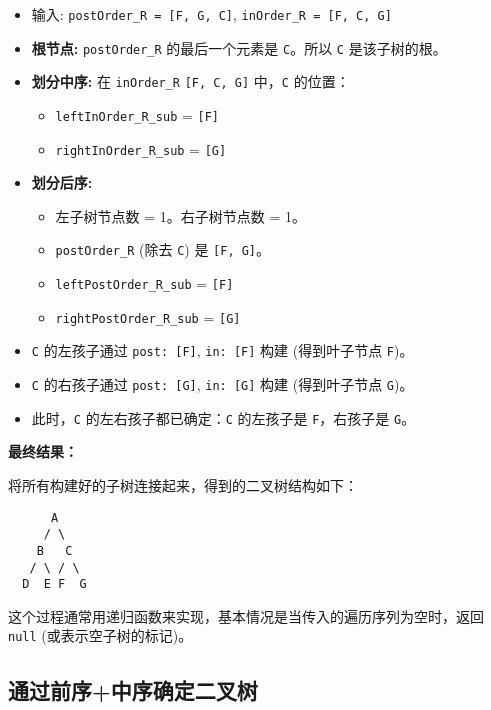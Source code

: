 \begin{enumerate}
	\begin{itemize}
		\item 输入: \lstinline{postOrder_R = [F, G, C]}, \lstinline{inOrder_R = [F, C, G]}
		\item \textbf{根节点:} \lstinline{postOrder_R} 的最后一个元素是 \lstinline{C}。所以 \lstinline{C} 是该子树的根。
		\item \textbf{划分中序:} 在 \lstinline{inOrder_R} \lstinline{[F, C, G]} 中，\lstinline{C} 的位置：
		\begin{itemize}
			\item \lstinline{leftInOrder_R_sub} = \lstinline{[F]}
			\item \lstinline{rightInOrder_R_sub} = \lstinline{[G]}
		\end{itemize}
		\item \textbf{划分后序:}
		\begin{itemize}
			\item 左子树节点数 = 1。右子树节点数 = 1。
			\item \lstinline{postOrder_R} (除去 \lstinline{C}) 是 \lstinline{[F, G]}。
			\item \lstinline{leftPostOrder_R_sub} = \lstinline{[F]}
			\item \lstinline{rightPostOrder_R_sub} = \lstinline{[G]}
		\end{itemize}
		\item \lstinline{C} 的左孩子通过 \lstinline{post: [F]}, \lstinline{in: [F]} 构建 (得到叶子节点 \lstinline{F})。
		\item \lstinline{C} 的右孩子通过 \lstinline{post: [G]}, \lstinline{in: [G]} 构建 (得到叶子节点 \lstinline{G})。
		\item 此时，\lstinline{C} 的左右孩子都已确定：\lstinline{C} 的左孩子是 \lstinline{F}，右孩子是 \lstinline{G}。
	\end{itemize}
\end{enumerate}

\textbf{最终结果：}

将所有构建好的子树连接起来，得到的二叉树结构如下：

\begin{lstlisting}
      A
     / \
    B   C
   / \ / \
  D  E F  G
\end{lstlisting}
这个过程通常用递归函数来实现，基本情况是当传入的遍历序列为空时，返回 \lstinline{null} (或表示空子树的标记)。

\subsection{通过前序+中序确定二叉树}

